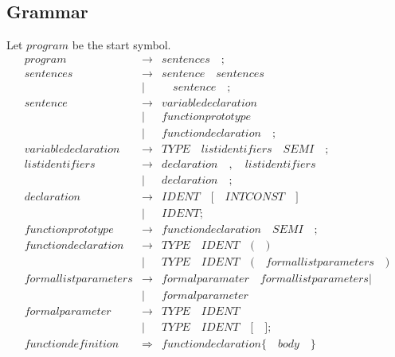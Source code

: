 \documentclass{article}
\begin{document}
\subsection*{Grammar}

Let $program$ be the start symbol. 
\begin{eqnarray}
  \mathit{program} & \rightarrow & \mathit{sentences} \quad ;
  \\
    \mathit{sentences} & \rightarrow & \mathit{sentence} \quad \mathit{sentences} \quad  \\
    & | & \quad \mathit{sentence} \quad ;
    \\
      \mathit{sentence} & \rightarrow & \mathit{variabledeclaration} \quad \\
      & |& \mathit{functionprototype} \quad \\
      & |& \mathit{functiondeclaration} \quad ;
\\
  \mathit{variabledeclaration} & \rightarrow & \mathit{TYPE} \quad \mathit{listidentifiers} \quad \mathit{SEMI} \quad ; 
  \\
  \mathit{listidentifiers} & \rightarrow & \mathit{declaration} \quad \mathit{,} \quad \mathit{listidentifiers} \quad   \\
  &  |& \mathit{declaration} \quad ; \\
  \mathit{declaration} & \rightarrow & \mathit{IDENT} \quad \mathit{[} \quad  \mathit{INTCONST} \quad \mathit{]} \quad  \\
  & | & \mathit{IDENT} ;  \\
  \mathit{functionprototype} & \rightarrow &  \mathit{functiondeclaration}  \quad \mathit{SEMI} \quad ;\\
  \mathit{functiondeclaration} & \rightarrow & \mathit{TYPE} \quad \mathit{IDENT} \quad  \mathit{(} \quad\mathit{)} \\
  & | & \mathit{TYPE}\quad\mathit{IDENT} \quad \mathit{(} \quad \mathit{formallistparameters} \quad \mathit{)}  \\ 
   \mathit{formallistparameters} & \rightarrow & \mathit{formalparamater} \quad \mathit{formallistparameters}  | \\
   & | & \mathit{formalparameter} \\
   \mathit{formalparameter} & \rightarrow & \mathit{TYPE} \quad \mathit{IDENT}  \\
   & | & \mathit{TYPE} \quad \mathit{IDENT} \quad \mathit{[} \quad \mathit{]} ; \\
   \mathit{functiondefinition} & \Rightarrow & \mathit{functiondeclaration} \mathit{\{}\quad \mathit{body}  \quad \mathit{\}}  \\

\end{eqnarray}
\end{document}
